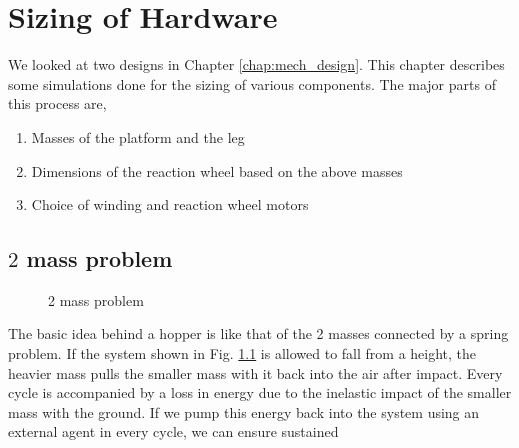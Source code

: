 \chapter{Sizing of Hardware}
\label{chap:sizing}
We looked at two designs in Chapter \ref{chap:mech_design}. This chapter describes some simulations done
for the sizing of various components. The major parts of this process are,
\begin{enumerate}
\item
Masses of the platform and the leg
\item
Dimensions of the reaction wheel based on the above masses
\item
Choice of winding and reaction wheel motors
\end{enumerate}

\section{$2$ mass problem}
\begin{figure}[!h]
\centering
{}
\caption[2 mass problem]{2 mass problem \cite{simit}}
\label{fig:4_2mass}
\end{figure}
The basic idea behind a hopper is like that of the 2 masses connected by a spring problem. If the system shown in Fig.
\ref{fig:4_2mass} is allowed to fall from a height, the heavier mass pulls the smaller mass with it back into the air
after impact. Every cycle is accompanied by a loss in energy due to the inelastic impact of the smaller mass with the
ground. If we pump this energy back into the system using an external agent in every cycle, we can ensure sustained
